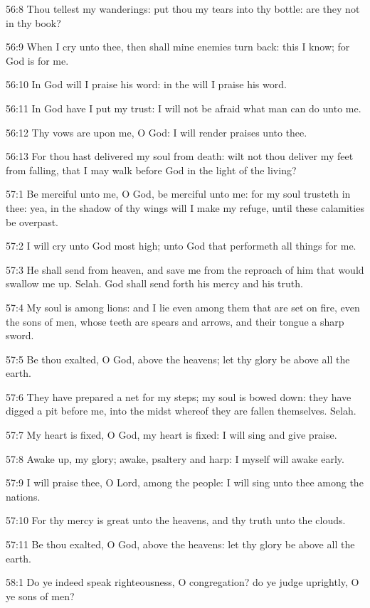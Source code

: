 56:8 Thou tellest my wanderings: put thou my tears into thy bottle: are they not in thy book?

56:9 When I cry unto thee, then shall mine enemies turn back: this I know; for God is for me.

56:10 In God will I praise his word: in the \LORD will I praise his word.

56:11 In God have I put my trust: I will not be afraid what man can do unto me.

56:12 Thy vows are upon me, O God: I will render praises unto thee.

56:13 For thou hast delivered my soul from death: wilt not thou deliver my feet from falling, that I may walk before God in the light of the living?



57:1 Be merciful unto me, O God, be merciful unto me: for my soul trusteth in thee: yea, in the shadow of thy wings will I make my refuge, until these calamities be overpast.

57:2 I will cry unto God most high; unto God that performeth all things for me.

57:3 He shall send from heaven, and save me from the reproach of him that would swallow me up. Selah. God shall send forth his mercy and his truth.

57:4 My soul is among lions: and I lie even among them that are set on fire, even the sons of men, whose teeth are spears and arrows, and their tongue a sharp sword.

57:5 Be thou exalted, O God, above the heavens; let thy glory be above all the earth.

57:6 They have prepared a net for my steps; my soul is bowed down: they have digged a pit before me, into the midst whereof they are fallen themselves. Selah.

57:7 My heart is fixed, O God, my heart is fixed: I will sing and give praise.

57:8 Awake up, my glory; awake, psaltery and harp: I myself will awake early.

57:9 I will praise thee, O Lord, among the people: I will sing unto thee among the nations.

57:10 For thy mercy is great unto the heavens, and thy truth unto the clouds.

57:11 Be thou exalted, O God, above the heavens: let thy glory be above all the earth.



58:1 Do ye indeed speak righteousness, O congregation? do ye judge uprightly, O ye sons of men?

